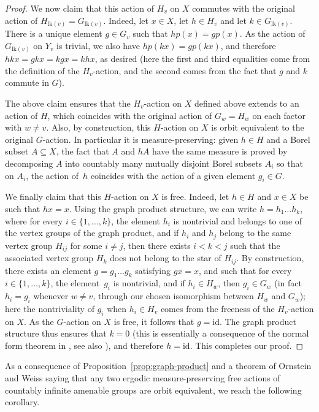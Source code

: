 \documentclass[JEP,XML,SOM,Unicode,NoFloatCountersInSection,published]{cedram}
\theoremstyle{plain}
\theoremstyle{definition}
\newcommand{\lk}{\mathrm{lk}}
\begin{document}
\begin{proof}
We now claim that this action of $H_v$ on $X$ commutes with the original action of $H_{\lk(v)}=G_{\lk(v)}$. Indeed, let $x\in X$, let $h\in H_v$ and let $k\in G_{\lk(v)}$. There is a unique element $g\in G_v$ such that $hp(x)=gp(x)$. As the action of $G_{\lk(v)}$ on $Y_v$ is trivial, we also have $hp(kx)=gp(kx)$, and therefore $hkx=gkx=kgx=khx$, as desired (here the first and third equalities come from the definition of the $H_v$-action, and the second comes from the fact that $g$ and $k$ commute in $G$).

The above claim ensures that the $H_v$-action on $X$ defined above extends to an action of $H$, which coincides with the original action of $G_w=H_w$ on each factor with $w\neq v$. Also, by construction, this $H$-action on $X$ is orbit equivalent to the original $G$-action. In particular it is measure-preserving: given $h\in H$ and a Borel subset $A\subseteq X$, the fact that $A$ and $hA$ have the same measure is proved by decomposing $A$ into countably many mutually disjoint Borel subsets $A_i$ so that on $A_i$, the action of~$h$ coincides with the action of a given element $g_i\in G$.

We finally claim that this $H$-action on $X$ is free. Indeed, let $h\in H$ and $x\in X$ be such that $hx=x$. Using the graph product structure, we can write $h=h_1\dots h_k$, where for every $i\in\{1,\dots,k\}$, the element $h_i$ is nontrivial and belongs to one of the vertex groups of the graph product, and if $h_i$ and $h_j$ belong to the same vertex group $H_{ij}$ for some $i\neq j$, then there exists $i<k<j$ such that the associated vertex group $H_k$ does not belong to the star of $H_{ij}$. By construction, there exists an element $g=g_1\dots g_k$ satisfying $gx=x$, and such that for every $i\in\{1,\dots,k\}$, the element~$g_i$ is nontrivial, and if $h_i\in H_w$, then $g_i\in G_w$ (in fact $h_i=g_i$ whenever $w\neq v$, through our chosen isomorphism between $H_w$ and $G_w$); here the nontriviality of $g_i$ when $h_i\in H_v$ comes from the freeness of the $H_v$-action on $X$. As the $G$-action on $X$ is free, it follows that $g=\mathrm{id}$. The graph product structure thus ensures that $k=0$ (this is essentially a consequence of the normal form theorem in \cite{green1990graph}, see also \cite[\S 3]{hermiller1995algorithms}), and therefore $h=\mathrm{id}$. This completes our proof.
\end{proof}

As a consequence of Proposition~\ref{prop:graph-product} and a theorem of Ornstein and Weiss \cite{OW} saying that any two ergodic measure-preserving free actions of countably infinite amenable groups are orbit equivalent, we reach the following corollary.
\end{document}
